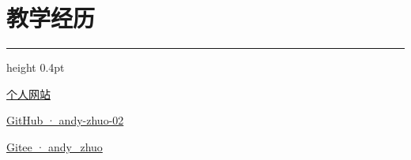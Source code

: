 \documentclass{resume}
\begin{document}
\section{教学经历}
\vfill
\vspace{6pt}
{\color{hairline}\hrule height 0.4pt}
\vspace{5pt}
\noindent\hfill
\begin{minipage}[t]{0.27\textwidth}\centering
  {\color{black}\setlength{\fboxsep}{2mm}\colorbox{white}{}}\par
  {\fontsize{9}{11}\selectfont\href{https://andy-zhuo-02.github.io/}{个人网站}}\par
\end{minipage}\hfill
\begin{minipage}[t]{0.27\textwidth}\centering
  {\color{black}\setlength{\fboxsep}{2mm}\colorbox{white}{}}\par
  {\fontsize{9}{11}\selectfont\href{https://github.com/andy-zhuo-02}{GitHub · andy-zhuo-02}}\par
\end{minipage}\hfill
\begin{minipage}[t]{0.27\textwidth}\centering
  {\color{black}\setlength{\fboxsep}{2mm}\colorbox{white}{}}\par
  {\fontsize{9}{11}\selectfont\href{https://gitee.com/andy_zhuo}{Gitee · andy\_zhuo}}\par
\end{minipage}\hfill\null
\end{document}
